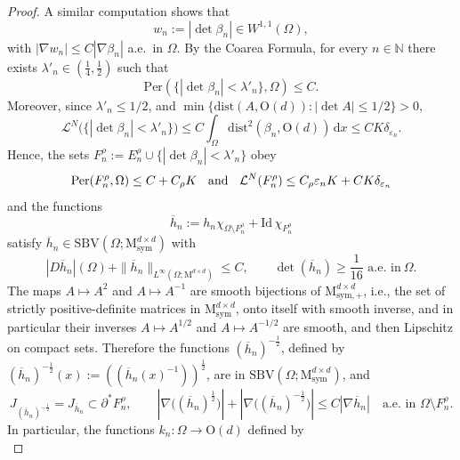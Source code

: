 \documentclass[a4paper,reqno]{amsart}
\newcommand\N{\mathbb{N}}
\newcommand{\SBV}{\mathrm{SBV}}
\newcommand\calL{\mathcal{L}}
\newcommand\dist{{\mathrm{dist}}}
\newcommand\Id{{\mathrm{Id}}}
\newcommand\sym{{\mathrm{sym}}}
\newcommand\eps{{\varepsilon}}
\newcommand{\Per}{\mathrm{Per}}
\theoremstyle{remark}
\newcommand\dx{{\,\mathrm{d}x}}
\newcommand{\ol}{\overline}
\newcommand{\sm}{\setminus}
\newcommand{\On}{\mathrm{O}(d)}
\newcommand{\Mno}{\mathrm{M}^{d\times d}}
\newcommand{\Mns}{\mathrm{M}^{d\times d}_{\mathrm{sym}}}
\newcommand{\Mnsp}{\mathrm{M}^{d\times d}_{\mathrm{sym},+}}
\newcommand{\LN}{\calL^N}
\numberwithin{equation}{section}
\begin{document}
\begin{proof}
	A similar computation shows that 
	\[
	w_n:=|\det \beta_n| \in W^{1,1}(\Omega),
	\]
	with $|\nabla w_n|\le C |\nabla\beta_n|$ a.e.\ in $\Omega$.
	By the Coarea Formula, for every $n\in \N$ there exists $\lambda'_n\in (\frac14,\frac12)$ such that
	\begin{equation}\label{2401241247}
		\Per(\{ |\det \beta_n| < \lambda'_n\}, \Omega ) \leq C.
	\end{equation}
	Moreover, since $ \lambda'_n \le 1/2$, and
	$\min\{\dist(A,\On): |\det A|\le1/2\}>0$,
%
%
	\[
	\LN\big( \{ |\det \beta_n| < \lambda'_n\}  \big)
\leq C \int_\Omega \dist^2(\beta_n, \On) \dx \leq CK \delta_{\varepsilon_n}.
	\]
	Hence, the sets $F_n^\rho:= E_n^\rho \cup \{ |\det \beta_n| < \lambda'_n\}$
obey
\begin{equation}\label{eqcptpropenrhoF}
	\Per(F_n^\rho, \Omega)\le  C+C_\rho K
	\hskip2mm\text{ and }\hskip2mm
\LN(F_n^\rho)\le C_\rho \eps_n K+
CK \delta_{\varepsilon_n}
\end{equation}
and the functions
	\begin{equation}\label{2401241351}
		\ol h_n:= h_n \chi_{\Omega \sm F_n^\rho} + \Id\,  \chi_{F_n^\rho}
	\end{equation}
	satisfy $\ol{h}_n \in \SBV(\Omega; \Mno_\sym)$  with
	\begin{equation}\label{2401241353}
		|D\ol{h}_n|(\Omega)+ \|\ol{h}_n\|_{L^\infty(\Omega; \Mno)}\leq C, \qquad \det(\ol{h}_n)\geq \frac{1}{16} \text{ a.e.\ in}\ \Omega.
	\end{equation}
The maps $A\mapsto A^2$ and $A\mapsto A^{-1}$ are smooth bijections of $\Mnsp$,
i.e., the set of strictly positive-definite matrices in $\Mns$, onto itself  with smooth inverse, and in particular their inverses $A\mapsto A^{1/2}$ and $A\mapsto A^{-1/2}$ are smooth, and then Lipschitz on compact sets.
Therefore  the functions $(\ol{h}_n)^{-\frac{1}{2}}$, defined by $(\ol{h}_n)^{-\frac{1}{2}}(x):=\left((\ol{h}_n(x)^{-1})\right)^{\frac{1}{2}}$, are  in $\SBV(\Omega; \Mns)$,  and
	\begin{equation}\label{2801241031}
		J_{(\ol{h}_n)^{-\frac{1}{2}}}=J_{\ol{h}_n}\subset \partial^* F_n^\rho, \qquad
		|\nabla \big((\ol h_n)^{\frac{1}{2}}\big)| +|\nabla \big((\ol h_n)^{-\frac{1}{2}}\big)| \leq C |\nabla \ol h_n| \quad\text{a.e.\ in }\Omega\sm F_n^\rho.
	\end{equation}
	In particular, the functions $k_n\colon \Omega \to \On$ defined by
	\begin{equation}\label{2602241346}

\end{equation}
\end{proof}
\end{document}
